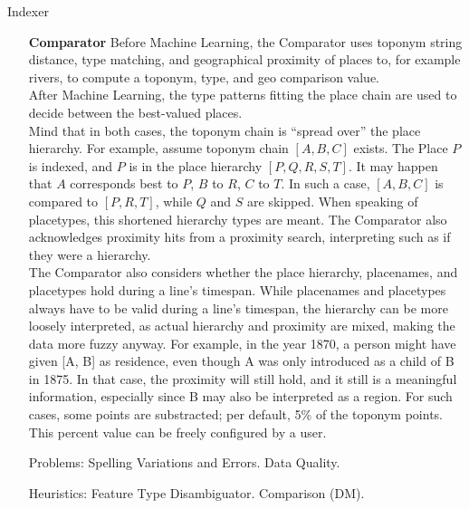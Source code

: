 \documentclass[11pt]{article}
\begin{document}
\begin{algorithm}[H]

\caption{Indexer}
\end{algorithm}

\newpage

\begin{itemize}
\item[\textbf{Comparator}] Before Machine Learning, the Comparator uses toponym string distance, type matching, and geographical proximity of places to, for example rivers, to compute a toponym, type, and geo comparison value.\\
After Machine Learning, the type patterns fitting the place chain are used to decide between the best-valued places.\\
Mind that in both cases, the toponym chain is ``spread over'' the place hierarchy. For example, assume toponym chain $[A, B, C]$ exists. The Place $P$ is indexed, and $P$ is in the place hierarchy $[P, Q, R, S, T]$. It may happen that $A$ corresponds best to $P$, $B$ to $R$, $C$ to $T$. In such a case, $[A, B, C]$ is compared to $[P, R, T]$, while $Q$ and $S$ are skipped. When speaking of placetypes, this shortened hierarchy types are meant. The Comparator also acknowledges proximity hits from a proximity search, interpreting such as if they were a hierarchy.\\
The Comparator also considers whether the place hierarchy, placenames, and placetypes hold during a line's timespan. While placenames and placetypes always have to be valid during a line's timespan, the hierarchy can be more loosely interpreted, as actual hierarchy and proximity are mixed, making the data more fuzzy anyway. For example, in the year 1870, a person might have given [A, B] as residence, even though A was only introduced as a child of B in 1875. In that case, the proximity will still hold, and it still is a meaningful information, especially since B may also be interpreted as a region. For such cases, some points are substracted; per default, 5\% of the toponym points. This percent value can be freely configured by a user.
\item[Problems:] Spelling Variations and Errors. Data Quality.
\item[Heuristics:] Feature Type Disambiguator. Comparison (DM).
\end{itemize}
\end{document}
